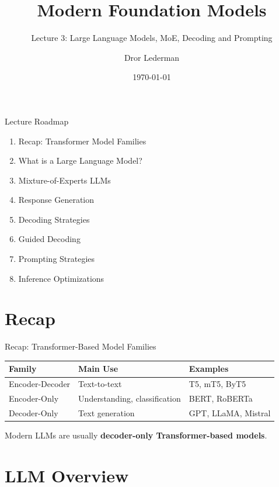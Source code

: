 \documentclass[aspectratio=169]{beamer}
\title{Modern Foundation Models}
\subtitle{Lecture 3: Large Language Models, MoE, Decoding and Prompting}
\author{Dror Lederman}
\institute{Holon Institute of Technology}
\date{\today}
\begin{document}
\begin{frame}
\titlepage
\end{frame}

\begin{frame}{Lecture Roadmap}
\begin{enumerate}
    \item Recap: Transformer Model Families
    \item What is a Large Language Model?
    \item Mixture-of-Experts LLMs
    \item Response Generation
    \item Decoding Strategies
    \item Guided Decoding
    \item Prompting Strategies
    \item Inference Optimizations
\end{enumerate}
\end{frame}

\section{Recap}

\begin{frame}{Recap: Transformer-Based Model Families}

\begin{table}
\centering
\begin{tabular}{lll}
\toprule
Family & Main Use & Examples \\
\midrule
Encoder-Decoder & Text-to-text & T5, mT5, ByT5 \\
Encoder-Only & Understanding, classification & BERT, RoBERTa \\
Decoder-Only & Text generation & GPT, LLaMA, Mistral \\
\bottomrule
\end{tabular}
\end{table}

\vspace{0.4cm}

Modern LLMs are usually \textbf{decoder-only Transformer-based models}.

\end{frame}

\section{LLM Overview}
\end{document}
